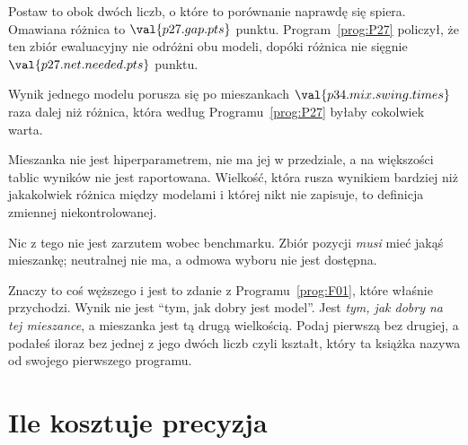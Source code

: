 \begin{fr}

Postaw to obok dwóch liczb, o które to porównanie naprawdę się spiera.
Omawiana różnica to $\val{p27.gap.pts}$ punktu. Program~\ref{prog:P27}
policzył, że ten zbiór ewaluacyjny nie odróżni obu modeli, dopóki różnica nie
sięgnie $\val{p27.net.needed.pts}$ punktu.

\begin{trapbox}
Wynik jednego modelu porusza się po mieszankach $\val{p34.mix.swing.times}$
raza dalej niż różnica, która według Programu~\ref{prog:P27} byłaby cokolwiek
warta.

Mieszanka nie jest hiperparametrem, nie ma jej w przedziale, a na większości
tablic wyników nie jest raportowana. Wielkość, która rusza wynikiem bardziej
niż jakakolwiek różnica między modelami i której nikt nie zapisuje, to
definicja zmiennej niekontrolowanej.
\end{trapbox}
\end{fr}

\begin{fr}
Nic z tego nie jest zarzutem wobec benchmarku. Zbiór pozycji \emph{musi} mieć
jakąś mieszankę; neutralnej nie ma, a odmowa wyboru nie jest dostępna.

Znaczy to coś węższego i jest to zdanie z Programu~\ref{prog:F01}, które
właśnie przychodzi. Wynik nie jest \enquote{tym, jak dobry jest model}. Jest
\emph{tym, jak dobry na tej mieszance}, a mieszanka jest tą drugą wielkością.
Podaj pierwszą bez drugiej, a podałeś iloraz bez jednej z jego dwóch liczb
\dash{} czyli kształt, który ta książka nazywa od swojego pierwszego programu.

\end{fr}

\section{Ile kosztuje precyzja}
\label{sec:P34-interval}


